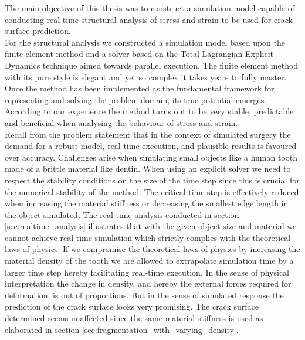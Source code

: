 
The main objective of this thesis was to construct a simulation model
capable of conducting real-time structural analysis of stress and
strain to be used for crack surface prediction. \\

%
For the structural analysis we constructed a simulation model based upon
the finite element method and a solver based on the Total Lagrangian
Explicit Dynamics technique aimed towards parallel execution. 
%
The finite element method with its pure style is elegant and
yet so complex it takes years to fully master.
Once the method has been implemented as the fundamental framework for
representing and solving the problem domain, its true potential emerges. 
According to our experience the method turns out to be very
stable, predictable and beneficial when analysing the behaviour of stress
and strain. \\

% 
Recall from the problem statement that in the context of simulated
surgery the demand for a robust model, real-time execution, and
plausible results is favoured over accuracy.
%
Challenges arise when simulating small objects like a human tooth
made of a brittle material like dentin. 
%
When using an explicit solver we need to respect the stability
conditions on the size of the time step since this is crucial for the
numerical stability of the method.
%
The critical time step is effectively reduced when increasing the
material stiffness or decreasing the smallest edge 
length in the object simulated.
%
The real-time analysis conducted in section
\vref{sec:realtime_analysis} illustrates that with the given
object size and material we cannot achieve real-time simulation which
strictly complies with the theoretical laws of physics.
If we compromise the
theoretical laws of physics by increasing the material density of the tooth we
are allowed to extrapolate simulation time by a larger time step hereby
facilitating real-time execution. In the sense of physical
interpretation the change in density, and hereby the external forces
required for deformation, is out of proportions. But in the sense of 
simulated response the prediction of the crack surface looks very
promising. The crack surface determined seems unaffected since the
same material stiffness is used as elaborated in 
section \vref{sec:fragmentation_with_varying_density}. \\

